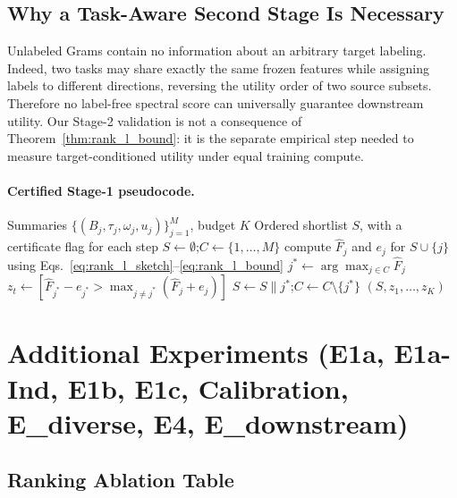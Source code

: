 \documentclass{article}
\begin{document}
\subsection{Why a Task-Aware Second Stage Is Necessary}
\label{sec:transfer_connection}

Unlabeled Grams contain no information about an arbitrary target labeling.
Indeed, two tasks may share exactly the same frozen features while assigning
labels to different directions, reversing the utility order of two source
subsets.  Therefore no label-free spectral score can universally guarantee
downstream utility.  Our Stage-2 validation is not a consequence of
Theorem~\ref{thm:rank_l_bound}: it is the separate empirical step needed to
measure target-conditioned utility under equal training compute.


\paragraph{Certified Stage-1 pseudocode.}

\begin{algorithm}[h]
\caption{Collapse-Gram-$L$ Greedy Screening}
\label{alg:collapse_greedy}
\begin{algorithmic}[1]
\Require Summaries $\{(B_j,\tau_j,\omega_j,u_j)\}_{j=1}^M$, budget $K$
\Ensure Ordered shortlist $S$, with a certificate flag for each step
\State $S\gets\emptyset$;\quad $C\gets\{1,\ldots,M\}$
    \State compute $\widehat F_j$ and $e_j$ for $S\cup\{j\}$ using
      Eqs.~\eqref{eq:rank_l_sketch}--\eqref{eq:rank_l_bound}
  \EndFor
  \State $j^*\gets\arg\max_{j\in C}\widehat F_j$
  \State $z_t\gets[\widehat F_{j^*}-e_{j^*}>
    \max_{j\neq j^*}(\widehat F_j+e_j)]$
  \State $S\gets S\mathbin{\|}j^*$;\quad $C\gets C\setminus\{j^*\}$
\EndFor
\State \Return $(S,z_1,\ldots,z_K)$
\end{algorithmic}
\end{algorithm}

\section{Additional Experiments (E1a, E1a-Ind, E1b, E1c, Calibration, E\_diverse, E4, E\_downstream)}
\label{app:exp_extras}
\label{app:ablation_extra}

\subsection{Ranking Ablation Table}
\end{document}
